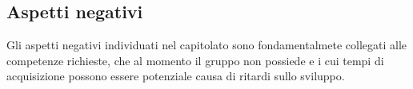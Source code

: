\documentclass[a4paper]{report}
\begin{document}
			\subsection{Aspetti negativi}
				Gli aspetti negativi individuati nel capitolato sono fondamentalmete collegati alle competenze 
				richieste, che al momento il gruppo non possiede e i cui tempi di acquisizione possono essere
				potenziale causa di ritardi sullo sviluppo.
	
	\cleardoublepage
	\listoftables
		
\end{document}
